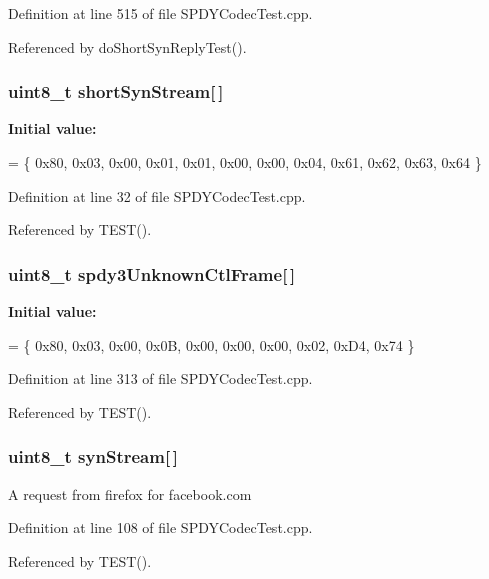 Definition at line 515 of file S\+P\+D\+Y\+Codec\+Test.\+cpp.



Referenced by do\+Short\+Syn\+Reply\+Test().

\subsubsection[{short\+Syn\+Stream}]{\setlength{\rightskip}{0pt plus 5cm}uint8\+\_\+t short\+Syn\+Stream[$\,$]}\label{SPDYCodecTest_8cpp_a35aaa70cdcea29aa370cd7452c56e994}
{\bfseries Initial value\+:}
\begin{DoxyCode}
=
\{ 0x80, 0x03, 0x00, 0x01,
  0x01, 0x00, 0x00, 0x04,  
  0x61, 0x62, 0x63, 0x64
\}
\end{DoxyCode}


Definition at line 32 of file S\+P\+D\+Y\+Codec\+Test.\+cpp.



Referenced by T\+E\+S\+T().

\subsubsection[{spdy3\+Unknown\+Ctl\+Frame}]{\setlength{\rightskip}{0pt plus 5cm}uint8\+\_\+t spdy3\+Unknown\+Ctl\+Frame[$\,$]}\label{SPDYCodecTest_8cpp_ac8d0fd94110856975f810f2ca4d3b026}
{\bfseries Initial value\+:}
\begin{DoxyCode}
=
\{ 0x80, 0x03, 0x00, 0x0B, 
  0x00, 0x00, 0x00, 0x02, 
  0xD4, 0x74 
\}
\end{DoxyCode}


Definition at line 313 of file S\+P\+D\+Y\+Codec\+Test.\+cpp.



Referenced by T\+E\+S\+T().

\subsubsection[{syn\+Stream}]{\setlength{\rightskip}{0pt plus 5cm}uint8\+\_\+t syn\+Stream[$\,$]}\label{SPDYCodecTest_8cpp_af23220e16cbf20c486ace9d0fd258e2f}
A request from firefox for facebook.\+com 

Definition at line 108 of file S\+P\+D\+Y\+Codec\+Test.\+cpp.



Referenced by T\+E\+S\+T().

